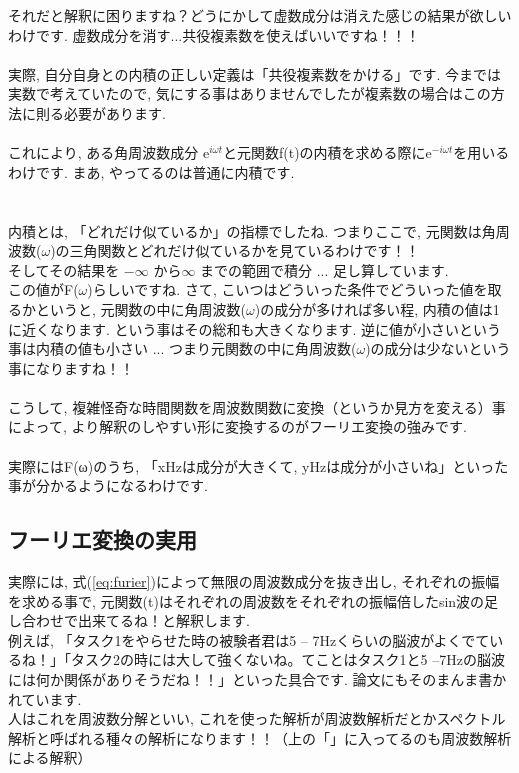 \documentclass[11pt,a4paper]{jreport}
\begin{document}
それだと解釈に困りますね？どうにかして虚数成分は消えた感じの結果が欲しいわけです. 虚数成分を消す...共役複素数を使えばいいですね！！！\\
\\
実際, 自分自身との内積の正しい定義は「共役複素数をかける」です. 今までは実数で考えていたので, 気にする事はありませんでしたが複素数の場合はこの方法に則る必要があります.\\
\\
これにより, ある角周波数成分 $\mathrm{e}^{i\omega t}$と元関数f(t)の内積を求める際に$\mathrm{e}^{-i\omega t}$を用いるわけです. まあ, やってるのは普通に内積です.\\
\\
\\
内積とは, 「どれだけ似ているか」の指標でしたね. つまりここで, 元関数は角周波数($\omega$)の三角関数とどれだけ似ているかを見ているわけです！！\\
そしてその結果を $-\infty$ から$\infty$ までの範囲で積分 ... 足し算しています.\\
この値がF($\omega$)らしいですね. さて, こいつはどういった条件でどういった値を取るかというと, 元関数の中に角周波数($\omega$)の成分が多ければ多い程, 内積の値は1に近くなります. という事はその総和も大きくなります. 逆に値が小さいという事は内積の値も小さい ... つまり元関数の中に角周波数($\omega$)の成分は少ないという事になりますね！！\\
\\
こうして, 複雑怪奇な時間関数を周波数関数に変換（というか見方を変える）事によって, より解釈のしやすい形に変換するのがフーリエ変換の強みです.\\
\\
実際にはF(ω)のうち, 「xHzは成分が大きくて, yHzは成分が小さいね」といった事が分かるようになるわけです.
\subsection{フーリエ変換の実用}
実際には, 式(\ref{eq:furier})によって無限の周波数成分を抜き出し, それぞれの振幅を求める事で, 元関数(t)はそれぞれの周波数をそれぞれの振幅倍したsin波の足し合わせで出来てるね！と解釈します.\\
例えば, 「タスク1をやらせた時の被験者君は5 -- 7Hzくらいの脳波がよくでているね！」「タスク2の時には大して強くないね。てことはタスク1と5 --7Hzの脳波には何か関係がありそうだね！！」といった具合です. 論文にもそのまんま書かれています.
\\
人はこれを周波数分解といい, これを使った解析が周波数解析だとかスペクトル解析と呼ばれる種々の解析になります！！（上の「」に入ってるのも周波数解析による解釈）
\end{document}
